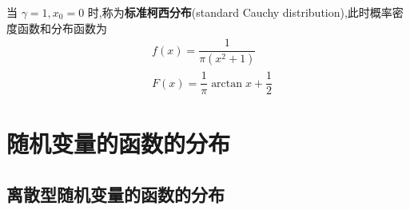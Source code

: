 当 $\gamma = 1, x_0 = 0$ 时,称为\textbf{标准柯西分布}(standard Cauchy distribution),此时概率密度函数和分布函数为
$$
\begin{aligned}
    & f(x) = \dfrac{1}{\pi(x^2 + 1)} \\
    & F(x) = \dfrac{1}{\pi} \arctan x + \dfrac{1}{2}
\end{aligned}
$$

\section{随机变量的函数的分布}

\subsection{离散型随机变量的函数的分布}




    
